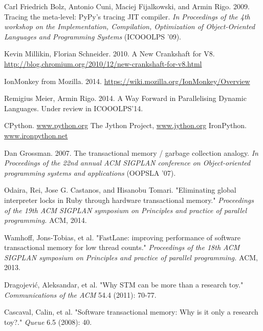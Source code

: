 \documentclass{sigplanconf}
\begin{document}
\begin{thebibliography}{}
\softraggedright

 Carl Friedrich Bolz, Antonio Cuni, Maciej
  Fijalkowski, and Armin Rigo. 2009. Tracing the meta-level: PyPy's
  tracing JIT compiler.  \emph{In Proceedings of the 4th workshop on the
    Implementation, Compilation, Optimization of Object-Oriented Languages
    and Programming Systems} (ICOOOLPS '09).

 Kevin Millikin, Florian Schneider. 2010.  A New
  Crankshaft for V8.
  \url{http://blog.chromium.org/2010/12/new-crankshaft-for-v8.html}

 IonMonkey from Mozilla. 2014.
  \url{https://wiki.mozilla.org/IonMonkey/Overview}

 Remigius Meier, Armin Rigo. 2014. A Way Forward
  in Parallelising Dynamic Languages. Under review in ICOOOLPS'14.

 CPython. \url{www.python.org}
 The Jython Project, \url{www.jython.org}
 IronPython. \url{www.ironpython.net}


  Dan Grossman. 2007. The transactional memory / garbage collection
  analogy. \emph{In Proceedings of the 22nd annual ACM SIGPLAN
    conference on Object-oriented programming systems and
    applications} (OOPSLA '07).


  Odaira, Rei, Jose G. Castanos, and Hisanobu Tomari.  "Eliminating
  global interpreter locks in Ruby through hardware transactional
  memory."  \emph{Proceedings of the 19th ACM SIGPLAN symposium on
    Principles and practice of parallel programming.} ACM, 2014.

  Wamhoff, Jons-Tobias, et al. "FastLane: improving performance of
  software transactional memory for low thread counts."
  \emph{Proceedings of the 18th ACM SIGPLAN symposium on Principles
    and practice of parallel programming.} ACM, 2013.

  Dragojević, Aleksandar, et al. "Why STM can be more than a research
  toy." \emph{Communications of the ACM} 54.4 (2011): 70-77.

  Cascaval, Calin, et al. "Software transactional memory: Why is it
  only a research toy?." \emph{Queue} 6.5 (2008): 40.


\end{thebibliography}
\end{document}
